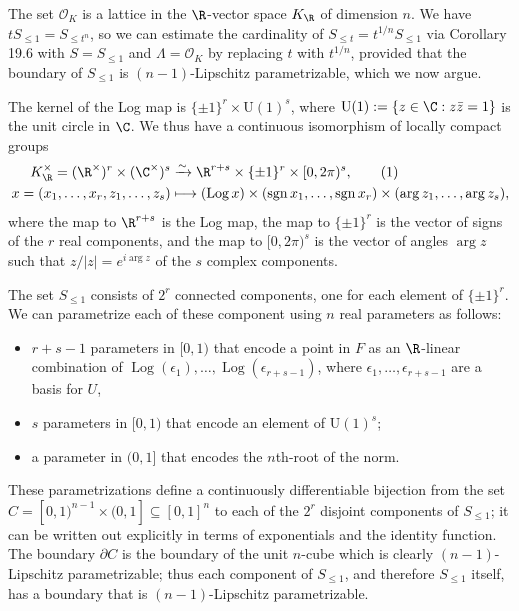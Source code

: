 The set $\mathcal O_K$ is a lattice in the $\R$-vector space $K_\R$ of dimension $n$. We have $tS_{\leq1}=S_{\leq t^n}$, so we can estimate the cardinality of $S_{\leq t}=t^{1/n}S_{\leq1}$ via Corollary 19.6 with $S=S_{\leq1}$ and $\Lambda=\mathcal O_K$ by replacing $t$ with $t^{1/n}$, provided that the boundary of $S_{\leq1}$ is $(n-1)$-Lipschitz parametrizable, which we now argue.

The kernel of the Log map is $\{\pm1\}^r\times\mathrm U(1)^s$, where $\mathrm U(1):=\{z\in\C:z\bar z=1\}$ is the unit circle in $\C$. We thus have a continuous isomorphism of locally compact groups
\begin{align*}
K_\R^\times=(\R^\times)^r\times(\C^\times)^s&\xrightarrow{\sim}\R^{r+s}\times\{\pm1\}^r\times[0,2\pi)^s,\tag{1}\\
x=(x_1,\ldots,x_r,z_1,\ldots,z_s)&\longmapsto(\operatorname{Log}x)\times(\operatorname{sgn}x_1,\ldots,\operatorname{sgn}x_r)\times(\arg z_1,\ldots,\arg z_s),
\end{align*}
where the map to $\R^{r+s}$ is the Log map, the map to $\{\pm1\}^r$ is the vector of signs of the $r$ real components, and the map to $[0,2\pi)^s$ is the vector of angles $\arg z$ such that $z/|z|=e^{i\arg z}$ of the $s$ complex components.

The set $S_{\leq1}$ consists of $2^r$ connected components, one for each element of $\{\pm1\}^r$. We can parametrize each of these component using $n$ real parameters as follows:
\begin{itemize}
\item $r+s-1$ parameters in $[0,1)$ that encode a point in $F$ as an $\R$-linear combination of $\operatorname{Log}(\epsilon_1),\ldots,\operatorname{Log}(\epsilon_{r+s-1})$, where $\epsilon_1,\ldots,\epsilon_{r+s-1}$ are a basis for $U$,
\item $s$ parameters in $[0,1)$ that encode an element of $\mathrm U(1)^s$;
\item a parameter in $(0,1]$ that encodes the $n$th-root of the norm.
\end{itemize}
These parametrizations define a continuously differentiable bijection from the set $C=[0,1)^{n-1}\times(0,1]\subseteq[0,1]^n$ to each of the $2^r$ disjoint components of $S_{\leq1}$; it can be written out explicitly in terms of exponentials and the identity function. The boundary $\partial C$ is the boundary of the unit $n$-cube which is clearly $(n-1)$-Lipschitz parametrizable; thus each component of $S_{\leq1}$, and therefore $S_{\leq1}$ itself, has a boundary that is $(n-1)$-Lipschitz parametrizable.

